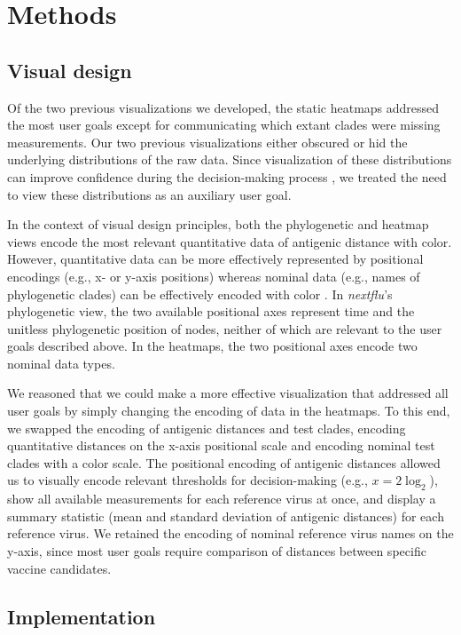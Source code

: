 \documentclass[utf8]{FrontiersinHarvard} %
\begin{document}
\section{Methods}

\subsection{Visual design}

Of the two previous visualizations we developed, the static heatmaps addressed the most user goals except for communicating which extant clades were missing measurements.
Our two previous visualizations either obscured or hid the underlying distributions of the raw data.
Since visualization of these distributions can improve confidence during the decision-making process \citep{correll2014error,Hullman2015,Fernandes2018}, we treated the need to view these distributions as an auxiliary user goal.

In the context of visual design principles, both the phylogenetic and heatmap views encode the most relevant quantitative data of antigenic distance with color.
However, quantitative data can be more effectively represented by positional encodings (e.g., x- or y-axis positions) whereas nominal data (e.g., names of phylogenetic clades) can be effectively encoded with color \citep{Mackinlay1986}.
In \emph{nextflu}'s phylogenetic view, the two available positional axes represent time and the unitless phylogenetic position of nodes, neither of which are relevant to the user goals described above.
In the heatmaps, the two positional axes encode two nominal data types.

We reasoned that we could make a more effective visualization that addressed all user goals by simply changing the encoding of data in the heatmaps.
To this end, we swapped the encoding of antigenic distances and test clades, encoding quantitative distances on the x-axis positional scale and encoding nominal test clades with a color scale.
The positional encoding of antigenic distances allowed us to visually encode relevant thresholds for decision-making (e.g., $x = 2\log_{2}$), show all available measurements for each reference virus at once, and display a summary statistic (mean and standard deviation of antigenic distances) for each reference virus.
We retained the encoding of nominal reference virus names on the y-axis, since most user goals require comparison of distances between specific vaccine candidates.

\subsection{Implementation}
\end{document}
